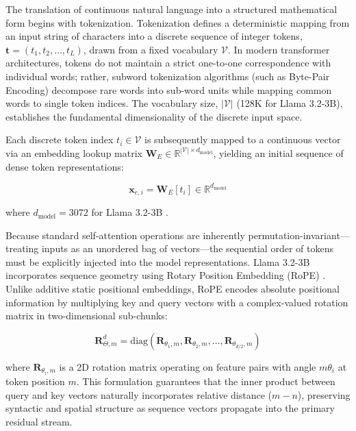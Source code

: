\documentclass[12 pt]{article}  %
\begin{document}
The translation of continuous natural language into a structured mathematical 
form begins with tokenization. Tokenization defines a deterministic mapping 
from an input string of characters into a discrete sequence of integer tokens, 
$\mathbf{t} = (t_1, t_2, \dots, t_L)$, drawn from a fixed vocabulary 
$\mathcal{V}$. In modern transformer architectures, tokens do not maintain a 
strict one-to-one correspondence with individual words; rather, subword 
tokenization algorithms (such as Byte-Pair Encoding) decompose rare words into 
sub-word units while mapping common words to single token indices. The 
vocabulary size, $|\mathcal{V}|$ (128K for Llama 3.2-3B), establishes the 
fundamental dimensionality of the discrete input space.

Each discrete token index $t_i \in \mathcal{V}$ is subsequently mapped to a 
continuous vector via an embedding lookup matrix 
$\mathbf{W}_E \in \mathbb{R}^{|\mathcal{V}| \times d_{\text{model}}}$, yielding 
an initial sequence of dense token representations:

\begin{equation}
    \mathbf{x}_{e, i} = \mathbf{W}_E[t_i] \in \mathbb{R}^{d_{\text{model}}}
\end{equation}

where $d_{\text{model}} = 3072$ for Llama 3.2-3B
\cite{grattafiori2024llama3herdmodels,Meta_2024}.

Because standard self-attention operations are inherently 
permutation-invariant—treating inputs as an unordered bag of vectors—the 
sequential order of tokens must be explicitly injected into the model 
representations. Llama 3.2-3B incorporates sequence geometry using Rotary 
Position Embedding (RoPE) \cite{grattafiori2024llama3herdmodels,Meta_2024,
su2023roformerenhancedtransformerrotary}. Unlike additive static positional 
embeddings, RoPE encodes absolute positional information by multiplying key and 
query vectors with a complex-valued rotation matrix in two-dimensional 
sub-chunks:

\begin{equation}
    \mathbf{R}_{\Theta, m}^{d} = \text{diag}
    \left( 
        \mathbf{R}_{\theta_1, m}, 
        \mathbf{R}_{\theta_2, m}, 
        \dots, 
        \mathbf{R}_{\theta_{d/2}, m}
    \right)
\end{equation}

where $\mathbf{R}_{\theta_i, m}$ is a 2D rotation matrix operating on feature 
pairs with angle $m\theta_i$ at token position $m$. This formulation guarantees 
that the inner product between query and key vectors naturally incorporates 
relative distance ($m - n$), preserving syntactic and spatial structure as 
sequence vectors propagate into the primary residual stream.
\end{document}
